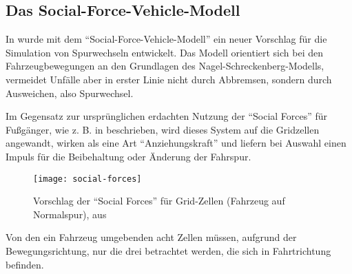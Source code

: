 \subsection*{Das Social-Force-Vehicle-Modell}
\label{sec:social-force-vm}

In \cite{dat-ba} wurde mit dem \enquote{Social-Force-Vehicle-Modell} ein neuer Vorschlag für die Simulation von Spurwechseln entwickelt. 
Das Modell orientiert sich bei den Fahrzeugbewegungen an den Grundlagen des Nagel-Schreckenberg-Modells, vermeidet Unfälle aber in erster Linie nicht durch Abbremsen, sondern durch Ausweichen, also Spurwechsel. 

Im Gegensatz zur ursprünglichen erdachten Nutzung der \enquote{Social Forces} für Fußgänger, wie z. B. in \cite{soc-for} beschrieben, wird dieses System auf die Gridzellen angewandt, wirken als eine Art \enquote{Anziehungskraft} und liefern bei Auswahl einen Impuls für die Beibehaltung oder Änderung der Fahrspur. 
\begin{figure}[hptb]
 \centering
 \texttt{[image: social-forces]}
 \caption[\enquote{Social Forces} für Grid-Zellen]{Vorschlag der \enquote{Social Forces} für Grid-Zellen (Fahrzeug auf Normalspur), aus \cite{dat-ba}}
 \label{figure:social-forces}
\end{figure}
\noindent
Von den ein Fahrzeug umgebenden acht Zellen müssen, aufgrund der Bewegungsrichtung, nur die drei betrachtet werden, die sich in Fahrtrichtung befinden.

